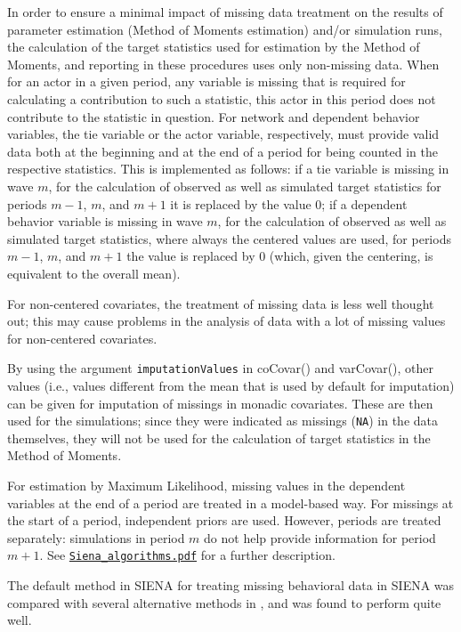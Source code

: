 \documentclass[a4paper,fleqn,11pt]{article}
\newcommand{\+}{\, + \,}
\newcommand{\sfn}[1]{\textsf{#1}}
\newcommand{\SI}{{\sf SIENA }}
\begin{document}
In order to ensure a minimal impact of missing data treatment on
the results of parameter estimation (Method of Moments estimation)
and/or simulation runs, the calculation of the target statistics
used for estimation by the Method of Moments, and reporting in these
procedures uses only non-missing data.
When for an actor in a given period, any variable is missing that is
required for calculating a contribution to such a statistic, this
actor in this period does not contribute to the statistic in
question. For network and dependent behavior variables, the tie variable
or the actor variable, respectively,
must provide valid data both at the beginning and at the end of a
period for being counted in the respective statistics.
This is implemented as follows: if a tie variable is missing in wave $m$,
for the calculation of observed as well as simulated target statistics
for periods $m-1$, $m$, and $m+1$ it is replaced by the value 0;
if a dependent behavior variable is missing in wave $m$,
for the calculation of observed as well as simulated target statistics,
where always the centered values are used, for periods $m-1$, $m$, and $m+1$
the value is replaced by 0 (which, given the centering,
is equivalent to the overall mean).

For non-centered covariates, the treatment of missing data is less
well thought out; this may cause problems in the analysis
of data with a lot of missing values for non-centered covariates.
\medskip

By using the argument \texttt{imputationValues} in \sfn{coCovar()}
and \sfn{varCovar()}, other values
(i.e., values different from the mean that is used by default
for imputation) can be given for imputation of missings
in monadic covariates.
These are then used for the simulations; since they were indicated as missings
(\texttt{NA}) in the data themselves, they will not be used for the calculation
of target statistics in the Method of Moments.
\medskip

For estimation by Maximum Likelihood, missing values in the dependent variables
at the end of a period are treated in a model-based way.
For missings at the start of a period, independent priors are used.
However, periods are treated separately: simulations in period $m$ do not help
provide information for period $m+1$.
See
\href{http://www.stats.ox.ac.uk/~snijders/siena/Siena_algorithms.pdf}{\texttt{Siena\_algorithms.pdf}}
for a further description.
\medskip

The default method in \SI for treating missing behavioral data in \SI was compared
with several alternative methods in \citet{ZandbergHuisman2019}, and was found to
perform quite well.
\end{document}
